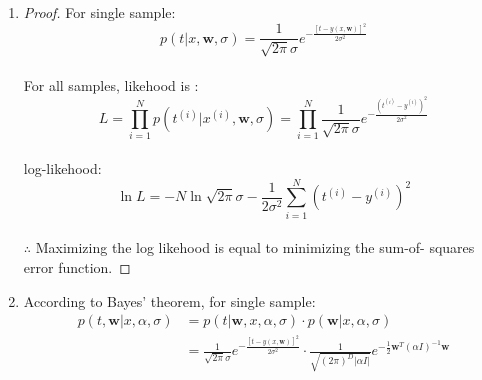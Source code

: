 \documentclass{article}
\begin{document}
\begin{enumerate}[(1)]
	\item 
	\begin{proof}
	For single sample:\\

	$$p(t|x,\textbf{w}, \sigma) = \frac{1}{\sqrt{2\pi}\sigma}e^{-\frac{[t-y(x,\textbf{w})]^2}{2\sigma^2}}$$\\
	For all samples, likehood is :\\
	$$L = \prod_{i=1}^{N} p(t^{(i)}|x^{(i)},\bm{w}, \sigma) = \prod_{i=1}^{N}\frac{1}{\sqrt{2\pi}\sigma}e^{-\frac{(t^{(i)}-y^{(i)})^2}{2\sigma^2}}$$\\
	log-likehood: \\
	$$\ln{L} = -N\ln{\sqrt{2\pi}\sigma}-\frac{1}{2\sigma^2}\sum_{i=1}^{N}(t^{(i)}-y^{(i)})^2$$\\
	$\therefore$ Maximizing the log likehood is equal to minimizing the sum-of- squares error function.
	\end{proof}
	\item 
	According to Bayes' theorem, for single sample:\\
	\begin{equation}
	\begin{aligned}
	p(t,\bm{w}|x, \alpha, \sigma) &= p(t|\bm{w}, x,\alpha, \sigma)\cdot p(\bm{w}|x,\alpha, \sigma)\\
	&=\frac{1}{\sqrt{2\pi}\sigma}e^{-\frac{[t-y(x,\textbf{w})]^2}{2\sigma^2}}\cdot \frac{1}{\sqrt{(2\pi)^D|\alpha I|}}e^{-\frac{1}{2}\bm{w}^T(\alpha I)^{-1}\bm{w}}\\

\end{aligned}
\end{equation}
\end{enumerate}
\end{document}
